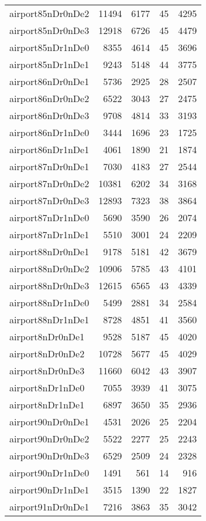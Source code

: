 \documentclass[../../../thesis.tex]{subfiles}
\begin{document}
\begin{longtable}{lrrrr}
airport85nDr0nDe2 & 11494 & 6177 & 45 & 4295 \\
airport85nDr0nDe3 & 12918 & 6726 & 45 & 4479 \\
airport85nDr1nDe0 & 8355 & 4614 & 45 & 3696 \\
airport85nDr1nDe1 & 9243 & 5148 & 44 & 3775 \\
airport86nDr0nDe1 & 5736 & 2925 & 28 & 2507 \\
airport86nDr0nDe2 & 6522 & 3043 & 27 & 2475 \\
airport86nDr0nDe3 & 9708 & 4814 & 33 & 3193 \\
airport86nDr1nDe0 & 3444 & 1696 & 23 & 1725 \\
airport86nDr1nDe1 & 4061 & 1890 & 21 & 1874 \\
airport87nDr0nDe1 & 7030 & 4183 & 27 & 2544 \\
airport87nDr0nDe2 & 10381 & 6202 & 34 & 3168 \\
airport87nDr0nDe3 & 12893 & 7323 & 38 & 3864 \\
airport87nDr1nDe0 & 5690 & 3590 & 26 & 2074 \\
airport87nDr1nDe1 & 5510 & 3001 & 24 & 2209 \\
airport88nDr0nDe1 & 9178 & 5181 & 42 & 3679 \\
airport88nDr0nDe2 & 10906 & 5785 & 43 & 4101 \\
airport88nDr0nDe3 & 12615 & 6565 & 43 & 4339 \\
airport88nDr1nDe0 & 5499 & 2881 & 34 & 2584 \\
airport88nDr1nDe1 & 8728 & 4851 & 41 & 3560 \\
airport8nDr0nDe1 & 9528 & 5187 & 45 & 4020 \\
airport8nDr0nDe2 & 10728 & 5677 & 45 & 4029 \\
airport8nDr0nDe3 & 11660 & 6042 & 43 & 3907 \\
airport8nDr1nDe0 & 7055 & 3939 & 41 & 3075 \\
airport8nDr1nDe1 & 6897 & 3650 & 35 & 2936 \\
airport90nDr0nDe1 & 4531 & 2026 & 25 & 2204 \\
airport90nDr0nDe2 & 5522 & 2277 & 25 & 2243 \\
airport90nDr0nDe3 & 6529 & 2509 & 24 & 2328 \\
airport90nDr1nDe0 & 1491 & 561 & 14 & 916 \\
airport90nDr1nDe1 & 3515 & 1390 & 22 & 1827 \\
airport91nDr0nDe1 & 7216 & 3863 & 35 & 3042 \\

\end{longtable}
\end{document}
